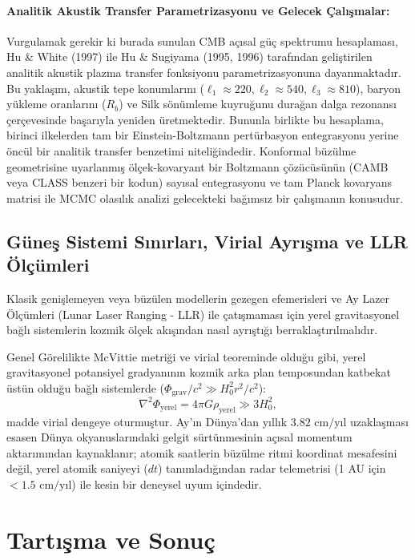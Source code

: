 \documentclass[11pt,a4paper]{article}
\begin{document}
\paragraph{Analitik Akustik Transfer Parametrizasyonu ve Gelecek Çalışmalar:}
Vurgulamak gerekir ki burada sunulan CMB açısal güç spektrumu hesaplaması, Hu \& White (1997) ile Hu \& Sugiyama (1995, 1996) tarafından geliştirilen analitik akustik plazma transfer fonksiyonu parametrizasyonuna dayanmaktadır. Bu yaklaşım, akustik tepe konumlarını ($\ell_1 \approx 220, \ell_2 \approx 540, \ell_3 \approx 810$), baryon yükleme oranlarını ($R_b$) ve Silk sönümleme kuyruğunu durağan dalga rezonansı çerçevesinde başarıyla yeniden üretmektedir. Bununla birlikte bu hesaplama, birinci ilkelerden tam bir Einstein-Boltzmann pertürbasyon entegrasyonu yerine öncül bir analitik transfer benzetimi niteliğindedir. Konformal büzülme geometrisine uyarlanmış ölçek-kovaryant bir Boltzmann çözücüsünün (CAMB veya CLASS benzeri bir kodun) sayısal entegrasyonu ve tam Planck kovaryans matrisi ile MCMC olasılık analizi gelecekteki bağımsız bir çalışmanın konusudur.

\subsection{Güneş Sistemi Sınırları, Virial Ayrışma ve LLR Ölçümleri}
Klasik genişlemeyen veya büzülen modellerin gezegen efemerisleri ve Ay Lazer Ölçümleri (Lunar Laser Ranging - LLR) ile çatışmaması için yerel gravitasyonel bağlı sistemlerin kozmik ölçek akışından nasıl ayrıştığı berraklaştırılmalıdır. 

Genel Görelilikte McVittie metriği ve virial teoreminde olduğu gibi, yerel gravitasyonel potansiyel gradyanının kozmik arka plan temposundan katbekat üstün olduğu bağlı sistemlerde ($\Phi_{\mathrm{grav}} / c^2 \gg H_0^2 r^2 / c^2$):
\begin{equation}
    \nabla^2 \Phi_{\mathrm{yerel}} = 4\pi G \rho_{\mathrm{yerel}} \gg 3 H_0^2,
\end{equation}
madde virial dengeye oturmuştur. Ay'ın Dünya'dan yıllık $3.82\text{ cm/yıl}$ uzaklaşması esasen Dünya okyanuslarındaki gelgit sürtünmesinin açısal momentum aktarımından kaynaklanır; atomik saatlerin büzülme ritmi koordinat mesafesini değil, yerel atomik saniyeyi ($dt$) tanımladığından radar telemetrisi (1 AU için $< 1.5\text{ cm/yıl}$) ile kesin bir deneysel uyum içindedir.

\section{Tartışma ve Sonuç}
\label{sec:tartisma_sonuc}
\end{document}
